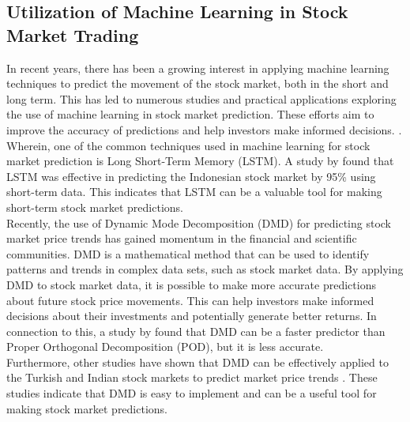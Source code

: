\subsection{Utilization of Machine Learning in Stock Market Trading}
In recent years, there has been a growing interest in applying machine 
learning techniques to predict the movement of the stock market, 
both in the short and long term. This has led to numerous studies and 
practical applications exploring the use of machine learning in stock market prediction.
 These efforts aim to improve the accuracy of predictions and help investors make 
 informed decisions.
\cite{Kumbure2022, Strader2020, Soni2022, Rea2020, Guo2022}.
 Wherein, one of the common techniques used in machine learning for 
 stock market prediction is Long Short-Term Memory (LSTM). 
 A study by  found that LSTM was effective in predicting the 
 Indonesian stock market by 95\% using short-term data. 
 This indicates that LSTM can be a valuable tool for making short-term stock 
 market predictions.
\\Recently, the use of Dynamic Mode Decomposition (DMD) 
for predicting stock market price trends has gained momentum in the financial 
and scientific communities. DMD is a mathematical method that can be used 
to identify patterns and trends in complex data sets, such as stock market data.
By applying DMD to stock market data, it is possible to make more accurate 
predictions about future stock price movements. This can help investors make
informed decisions about their investments and potentially generate better returns.
In connection to this, a study by  found that DMD can be a 
faster predictor than Proper Orthogonal Decomposition (POD), but 
it is less accurate.
\\Furthermore, other studies have shown that DMD can be effectively 
applied to the Turkish and Indian stock markets to predict market price trends
\cite{Savas2017, Kuttichira2017}.
These studies indicate that DMD is easy to implement and can be a useful 
tool for making stock market predictions.

